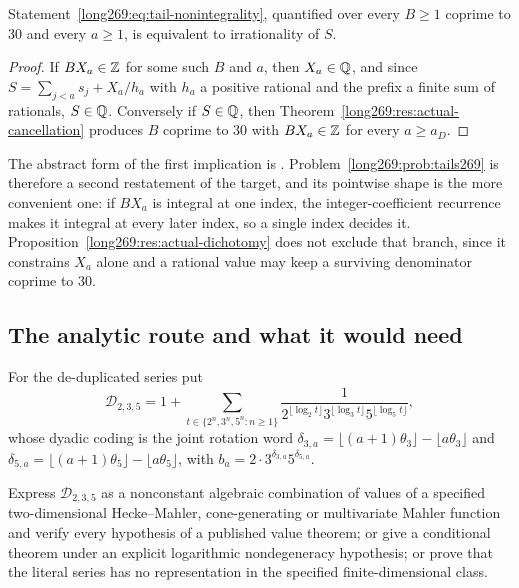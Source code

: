 \documentclass[11pt]{article}
\begin{document}
\begin{proposition}
\label{long269:res:tails-equivalence}
Statement~\eqref{long269:eq:tail-nonintegrality}, quantified over every $B\ge1$
coprime to $30$ and every $a\ge1$, is equivalent to irrationality of $S$.
\end{proposition}

\begin{proof}
If $BX_a\in\mathbb{Z}$ for some such $B$ and $a$, then $X_a\in\mathbb{Q}$, and since
$S=\sum_{j<a}s_j+X_a/h_a$ with $h_a$ a positive rational and the prefix a
finite sum of rationals, $S\in\mathbb{Q}$.  Conversely if $S\in\mathbb{Q}$, then
Theorem~\ref{long269:res:actual-cancellation} produces $B$ coprime to $30$ with
$BX_a\in\mathbb{Z}$ for every $a\ge a_D$.
\end{proof}

\noindent The abstract form of the first implication is
.
Problem~\ref{long269:prob:tails269} is therefore a second restatement of the target,
and its pointwise shape is the more convenient one: if $BX_a$ is integral at one index, the integer-coefficient recurrence
makes it integral at every later index, so a single index decides it.
Proposition~\ref{long269:res:actual-dichotomy} does not exclude that branch, since it
constrains $X_a$ alone and a rational value may keep a surviving denominator
coprime to $30$.

\subsection{The analytic route and what it would need}

For the de-duplicated series put
\[
 \mathcal D_{2,3,5}=1+
 \sum_{t\in\{2^{n},3^{n},5^{n}:n\ge1\}}
 \frac{1}{2^{\lfloor\log_2t\rfloor}3^{\lfloor\log_3t\rfloor}
           5^{\lfloor\log_5t\rfloor}} ,
\]
whose dyadic coding is the joint rotation word
$\delta_{3,a}=\lfloor(a+1)\theta_3\rfloor-\lfloor a\theta_3\rfloor$ and
$\delta_{5,a}=\lfloor(a+1)\theta_5\rfloor-\lfloor a\theta_5\rfloor$, with
$b_a=2\cdot3^{\delta_{3,a}}5^{\delta_{5,a}}$.

\begin{problem}
\label{long269:prob:representation}
Express $\mathcal D_{2,3,5}$ as a nonconstant algebraic combination of values
of a specified two-dimensional Hecke--Mahler, cone-generating or multivariate
Mahler function and verify every hypothesis of a published value theorem; or
give a conditional theorem under an explicit logarithmic nondegeneracy
hypothesis; or prove that the literal series has no representation in the
specified finite-dimensional class.
\end{problem}
\end{document}
